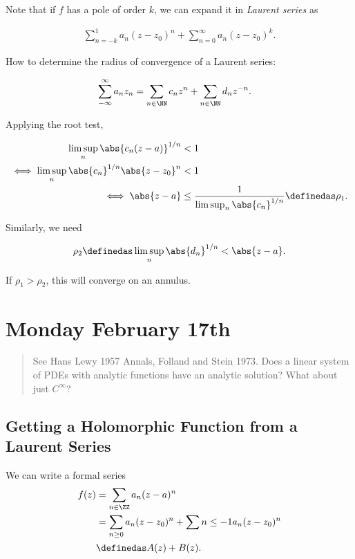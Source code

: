 Note that if \(f\) has a pole of order \(k\), we can expand it in
\emph{Laurent series} as

\begin{align*}
\sum_{n=-k}^1 a_n (z - z_0)^n + \sum_{n=0}^\infty a_n(z-z_0)^k
.\end{align*}

How to determine the radius of convergence
of a Laurent series:

\begin{align*}
\sum_{-\infty}^\infty a_n z_n
&= \sum_{n\in \NN} c_n z^n + \sum_{n\in \NN} d_n z^{-n} 
.\end{align*}

Applying the root test,

\begin{align*}
\limsup_n \abs{c_n (z-a)}^{1/n} &< 1 \\
\iff \limsup_n \abs{c_n}^{1/n} \abs{z-z_0}^n &< 1 \\
\iff \abs{z-a} &\leq \frac{1}{\limsup_n \abs{c_n}^{1/n}} \definedas \rho_1
.\end{align*}

Similarly, we need

\begin{align*}
\rho_2 \definedas \limsup_n \abs{d_n}^{1/n} < \abs {z-a}
.\end{align*}

If \(\rho_1> \rho_2\), this will converge on an annulus.

\hypertarget{monday-february-17th}{%
\section{Monday February 17th}\label{monday-february-17th}}

\begin{quote}
See Hans Lewy 1957 Annals, Folland and Stein 1973. Does a linear system
of PDEs with analytic functions have an analytic solution? What about
just \(C^\infty\)?
\end{quote}

\hypertarget{getting-a-holomorphic-function-from-a-laurent-series}{%
\subsection{Getting a Holomorphic Function from a Laurent
Series}\label{getting-a-holomorphic-function-from-a-laurent-series}}

We can write a formal series \begin{align*}
f(z) &= \sum_{n\in \ZZ}a_n (z-a)^n \\
&= \sum_{n\geq 0} a_n (z-z_0)^n + \sum{n\leq -1} a_n (z-z_0)^n \\
&\definedas A(z) + B(z)
.\end{align*}

